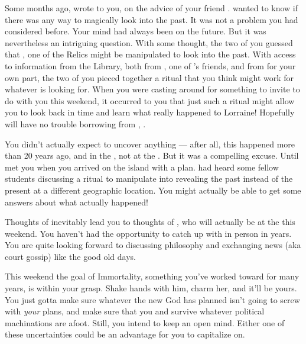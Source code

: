 \documentclass[char]{GL2020}
\begin{document}
Some months ago, \cHeir{\intro} wrote to you, on the advice of your friend \cLibrarian{}. \cHeir{} wanted to know if there was any way to magically look into the past. It was not a problem you had considered before. Your mind had always been on the future. But it was nevertheless an intriguing question. With some thought, the two of you guessed that \iMirror{}, one of the \pTech{} Relics might be manipulated to look into the past. With access to information from the Library, both from \cPresident{\intro}, one of \cHeir{}’s friends, and from \cLibrarian{} for your own part, the two of you pieced together a ritual that you think might work for whatever \cHeir{} is looking for. When you were casting around for something to invite \cChupStudent{} to do with you this weekend, it occurred to you that just such a ritual might allow you to look back in time and learn what really happened to Lorraine! Hopefully \cHeir{} will have no trouble borrowing \iMirror{} from \cHeir{\their} \cDiplomat{\auncle}, \cDiplomat{\intro}.

You didn’t actually expect to uncover anything — after all, this happened more than 20 years ago, and in the \pFarm{}, not at the \pSchool{}. But it was a compelling excuse. Until \cChupStudent{} met you when you arrived on the island with a plan. \cChupStudent{\They} had heard some fellow students discussing a ritual to manipulate \iMirror{} into revealing the past instead of the present at a different geographic location. You might actually be able to get some answers about what actually happened!

Thoughts of \cWildCardFriend{} inevitably lead you to thoughts of \cHedonist{}, who will actually be at the \pSchool{} this weekend. You haven’t had the opportunity to catch up with \cHedonist{} in person in years. You are quite looking forward to discussing philosophy and exchanging news (aka court gossip) like the good old days.


This weekend the goal of Immortality, something you’ve worked toward for many years, is within your grasp. Shake hands with him, charm her, and it’ll be yours. You just gotta make sure whatever the new God has planned isn’t going to screw with \emph{your} plans, and make sure that you and \cDisney{} survive whatever political machinations are afoot. Still, you intend to keep an open mind. Either one of these uncertainties could be an advantage for you to capitalize on.
\end{document}
